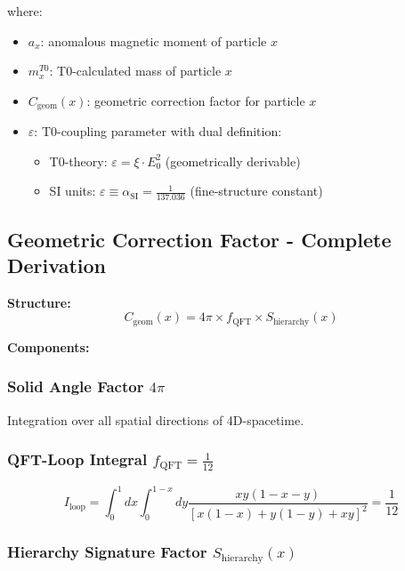 \documentclass[12pt,a4paper]{article}
\numberwithin{equation}{section}
\newcommand{\xipar}{\xi}
\newcommand{\epsilonT}{\varepsilon}
\newcommand{\alphaSI}{\alpha_{\text{SI}}}
\newcommand{\Cgeom}{C_{\text{geom}}}
\newcommand{\fQFT}{f_{\text{QFT}}}
\newcommand{\Eo}{E_0}
\begin{document}
	where:
	\begin{itemize}
		\item $a_x$: anomalous magnetic moment of particle $x$
		\item $m_x^{T0}$: T0-calculated mass of particle $x$
		\item $\Cgeom(x)$: geometric correction factor for particle $x$
		\item $\epsilonT$: T0-coupling parameter with dual definition:
		\begin{itemize}
			\item T0-theory: $\epsilonT = \xipar \cdot \Eo^2$ (geometrically derivable)
			\item SI units: $\epsilonT \equiv \alphaSI = \frac{1}{137.036}$ (fine-structure constant)
		\end{itemize}
	\end{itemize}
	
	\subsection{Geometric Correction Factor - Complete Derivation}
	
	\textbf{Structure:}
	\begin{equation}
		\Cgeom(x) = 4\pi \times \fQFT \times S_{\text{hierarchy}}(x)
		\label{eq:cgeom_structure}
	\end{equation}
	
	\textbf{Components:}
	
	\subsubsection{Solid Angle Factor $4\pi$}
	Integration over all spatial directions of 4D-spacetime.
	
	\subsubsection{QFT-Loop Integral $\fQFT = \frac{1}{12}$}
	\begin{equation}
		I_{\text{loop}} = \int_0^1 dx \int_0^{1-x} dy \frac{xy(1-x-y)}{[x(1-x) + y(1-y) + xy]^2} = \frac{1}{12}
		\label{eq:loop_integral}
	\end{equation}
	
	\subsubsection{Hierarchy Signature Factor $S_{\text{hierarchy}}(x)$}
	
\end{document}
